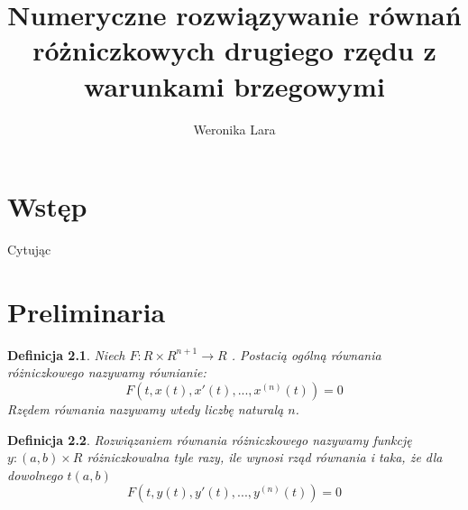 \documentclass[12pt,a4paper]{report}
\author{Weronika Lara}
\title{Numeryczne rozwiązywanie równań różniczkowych drugiego rzędu z warunkami brzegowymi}
\newtheorem{definition}{Definicja}
\begin{document}
\maketitle

\chapter{Wstęp}

Cytując \citep[Rozdział 3, sekcja 2]{palczewski2004rownania}

\chapter{Preliminaria}
\begin{definition}
Niech $F : R \times R^{n+1} \to R$ . Postacią ogólną równania różniczkowego nazywamy równianie: 
\begin{equation*}
F(t, x(t), x'(t),..., x^{(n)}(t)) = 0
\end{equation*} 
Rzędem równania nazywamy wtedy liczbę naturalą $n$. 
\end{definition}
\begin{definition}
Rozwiązaniem równania różniczkowego nazywamy funkcję $y:(a, b)\times R$ różniczkowalna tyle razy, ile wynosi rząd równania i taka, że dla dowolnego $t (a, b)$
\begin{equation*}
F(t, y(t), y'(t),..., y^{(n)}(t)) = 0
\end{equation*} 
\end{definition} 
\end{document}
